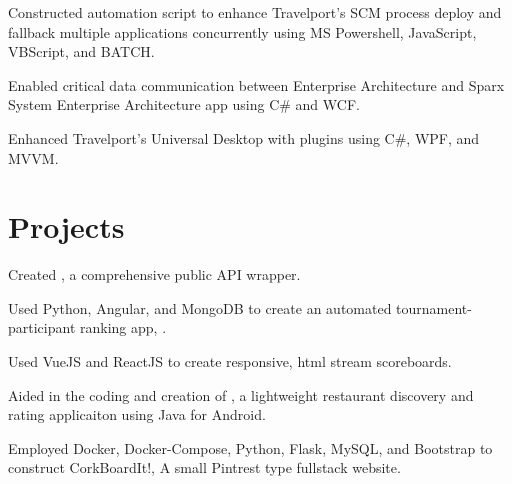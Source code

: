\documentclass[]{deedy-resume-openfont}
\begin{document}
\begin{minipage}[t]{0.66\textwidth}
\begin{tightemize}
\item Constructed automation script to enhance Travelport's SCM process deploy and fallback multiple applications concurrently using MS Powershell, JavaScript, VBScript, and BATCH.
\item Enabled critical data communication between Enterprise Architecture and Sparx System Enterprise Architecture app using C\# and WCF.
\item Enhanced Travelport's Universal Desktop with plugins using C\#, WPF, and MVVM.
\end{tightemize}
\sectionsep


\section{Projects}
\begin{tightemize} 
\item Created \href{http://npmjs.com/package/smashgg.js}{}, a comprehensive \href{www.smash.gg}{} public API wrapper. 
\item Used Python, Angular, and MongoDB to create an automated tournament-participant ranking app, \href{https://notgarpr.com}{}.
\item Used VueJS and ReactJS to create responsive, html stream scoreboards. 
\end{tightemize}
\sectionsep

\begin{tightemize}
\item Aided in the coding and creation of \href{https://play.google.com/store/apps/details?id=com.gmail.japa.arialdis.tasteslikechickenlite\&hl=en}{}, a lightweight restaurant discovery and rating applicaiton using Java for Android.
\item Employed Docker, Docker-Compose, Python, Flask, MySQL, and Bootstrap to construct CorkBoardIt!, A small Pintrest type fullstack website. 
\end{tightemize}
\sectionsep





\end{minipage} 
\end{document}

